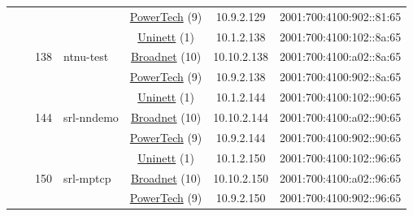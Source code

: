 \begin{small}
\begin{center}
\begin{longtable}{|c|c|c|c|c|c|c|c|}
  &  &  &  & \multicolumn{2}{|c|}{\tiny{\href{http://www.powertech.no}{PowerTech} (9)}} & \tiny{10.9.2.129} & \tiny{2001:700:4100:902::81:65} \\* \cline{3-3}\cline{4-4}\cline{5-5}\cline{6-6}\cline{7-7}\cline{8-8}
  &  & \multirow{3}{*}{\tiny{138}} & \multicolumn{1}{|l|}{\multirow{3}{*}{\tiny{ntnu-test}}} & \multicolumn{2}{|c|}{\tiny{\href{https://www.uninett.no}{Uninett} (1)}} & \tiny{10.1.2.138} & \tiny{2001:700:4100:102::8a:65} \\* \cline{5-5}\cline{6-6}\cline{7-7}\cline{8-8}
  &  &  &  & \multicolumn{2}{|c|}{\tiny{\href{https://www.broadnet.no}{Broadnet} (10)}} & \tiny{10.10.2.138} & \tiny{2001:700:4100:a02::8a:65} \\* \cline{5-5}\cline{6-6}\cline{7-7}\cline{8-8}
  &  &  &  & \multicolumn{2}{|c|}{\tiny{\href{http://www.powertech.no}{PowerTech} (9)}} & \tiny{10.9.2.138} & \tiny{2001:700:4100:902::8a:65} \\* \cline{3-3}\cline{4-4}\cline{5-5}\cline{6-6}\cline{7-7}\cline{8-8}
  &  & \multirow{3}{*}{\tiny{144}} & \multicolumn{1}{|l|}{\multirow{3}{*}{\tiny{srl-nndemo}}} & \multicolumn{2}{|c|}{\tiny{\href{https://www.uninett.no}{Uninett} (1)}} & \tiny{10.1.2.144} & \tiny{2001:700:4100:102::90:65} \\* \cline{5-5}\cline{6-6}\cline{7-7}\cline{8-8}
  &  &  &  & \multicolumn{2}{|c|}{\tiny{\href{https://www.broadnet.no}{Broadnet} (10)}} & \tiny{10.10.2.144} & \tiny{2001:700:4100:a02::90:65} \\* \cline{5-5}\cline{6-6}\cline{7-7}\cline{8-8}
  &  &  &  & \multicolumn{2}{|c|}{\tiny{\href{http://www.powertech.no}{PowerTech} (9)}} & \tiny{10.9.2.144} & \tiny{2001:700:4100:902::90:65} \\* \cline{3-3}\cline{4-4}\cline{5-5}\cline{6-6}\cline{7-7}\cline{8-8}
  &  & \multirow{3}{*}{\tiny{150}} & \multicolumn{1}{|l|}{\multirow{3}{*}{\tiny{srl-mptcp}}} & \multicolumn{2}{|c|}{\tiny{\href{https://www.uninett.no}{Uninett} (1)}} & \tiny{10.1.2.150} & \tiny{2001:700:4100:102::96:65} \\* \cline{5-5}\cline{6-6}\cline{7-7}\cline{8-8}
  &  &  &  & \multicolumn{2}{|c|}{\tiny{\href{https://www.broadnet.no}{Broadnet} (10)}} & \tiny{10.10.2.150} & \tiny{2001:700:4100:a02::96:65} \\* \cline{5-5}\cline{6-6}\cline{7-7}\cline{8-8}
  &  &  &  & \multicolumn{2}{|c|}{\tiny{\href{http://www.powertech.no}{PowerTech} (9)}} & \tiny{10.9.2.150} & \tiny{2001:700:4100:902::96:65} \\* \cline{3-3}\cline{4-4}\cline{5-5}\cline{6-6}\cline{7-7}\cline{8-8}

\end{longtable}
\end{center}
\end{small}
